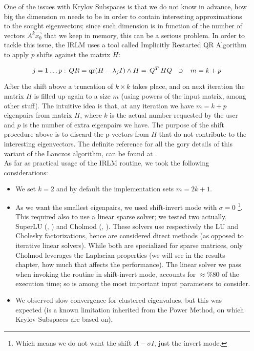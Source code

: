 One of the issues with Krylov Subspaces is that we do not know in
advance, how big the dimension $m$ needs to be in order to contain
interesting approximations to the sought eigenvectors; since such
dimension is in function of the number of vectors $A^k \vec{x_0}$ that
we keep in memory, this can be a serious problem. In order to tackle
this issue, the IRLM uses a tool called Implicitly Restarted QR
Algorithm to apply $p$ shifts against the matrix $H$:

\begin{equation*}
    j=1 \ldots p:\, QR = \func{qr}(H - \lambda_j I) \land H = \trans{Q}HQ
    \ds{\suchthat}
    m = k + p
\end{equation*}
\joinbelow{1cm}

After the shift above a truncation of $k \times k$ takes place, and on
next iteration the matrix $H$ is filled up again to a size $m$ (using
powers of the input matrix, among other stuff). The intuitive idea is that,
at any iteration we have $m = k + p$ eigenpairs from matrix $H$, where
$k$ is the actual number requested by the user and $p$ is the number
of extra eigenpairs we have. The purpose of the shift procedure above is to 
discard the p vectors from $H$ that do not contribute to the
interesting eigenvectors. The definite reference for all the gory
details of this variant of the Lanczos algorithm, can be found at
\cite{arpack}. \\

As far as practical usage of the IRLM routine, we took the following
considerations:

\begin{itemize}
\item We set $k=2$ and by default the implementation sets $m=2k+1$.
\item As we want the smallest eigenpairs, we used shift-invert mode
  with $\sigma=0$ \footnote{Which means we 
  do not want the shift $A - \sigma I$, just the invert mode.}. This
  required also to use a linear sparse solver; we tested two actually, SuperLU
  (\cite{superlu97}, \cite{superlu05}) and  Cholmod (\cite{cholmod08},
  \cite{cholmod08a}). These solvers use respectively the LU and
  Cholesky factorizations, hence are considered direct
  methods (as opposed to iterative linear solvers). While
  both are specialized for sparse matrices, only Cholmod leverages
  the Laplacian properties (we will see in the results chapter, how much
  that affects the performance). The linear solver we pass when invoking the
  routine in shift-invert mode, accounts for $\approx \%80$ of
  the execution time; so is among the most important input parameters
  to consider. 
\item We observed slow convergence for clustered eigenvalues, but this
  was expected (is a known limitation inherited from the Power
  Method, on which Krylov Subspaces are based on).
\end{itemize}

